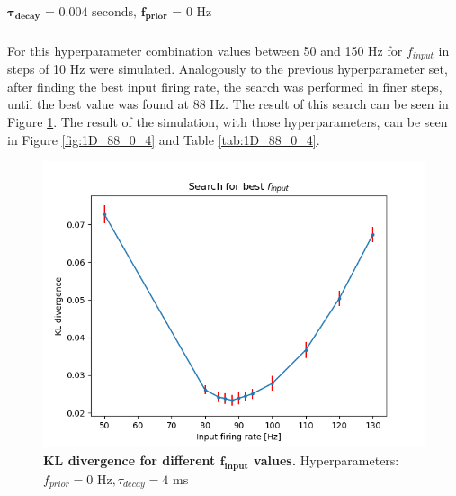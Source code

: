 \subparagraph{$\boldsymbol{\tau_{decay}} \text{ = 0.004 seconds, }\mathbf{f_{prior}} \text{ = 0 Hz}$}
For this hyperparameter combination values between 50 and 150 Hz for $f_{input}$ in steps of 10 Hz were simulated. Analogously to the previous hyperparameter set, after finding the best input firing rate, the search was performed in finer steps, until the best value was found at 88 Hz. The result of this search can be seen in Figure \ref{fig:1D_KLD_fPrior0_tau4}. The result of the simulation, with those hyperparameters, can be seen in Figure \ref{fig:1D_88_0_4} and Table \ref{tab:1D_88_0_4}.

\begin{figure}
\centering
  \includegraphics[width=0.75\linewidth]{figures/1D/KLDvsfInput_fPrior0tau4.png}
  \caption{\textbf{KL divergence for different $\mathbf{f_{input}}$ values.} Hyperparameters: $f_{prior} = 0\text{ Hz}, \tau_{decay} = 4\text{ ms}$}
  \label{fig:1D_KLD_fPrior0_tau4}
\end{figure}

